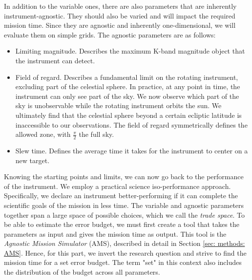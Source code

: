 \documentclass[12pt,a4paper]{article}
\numberwithin{equation}{section}
\numberwithin{figure}{section}
\numberwithin{table}{section}
\begin{document}
In addition to the variable ones, there are also parameters that are inherently instrument-agnostic. They should also be varied and will impact the required mission time. Since they are agnostic and inherently one-dimensional, we will evaluate them on simple grids. The agnostic parameters are as follows:
\begin{itemize}
    \item Limiting magnitude. Describes the maximum K-band magnitude object that the instrument can detect.
    \item Field of regard. Describes a fundamental limit on the rotating instrument, excluding part of the celestial sphere. In practice, at any point in time, the instrument can only see part of the sky. We now observe which part of the sky is unobservable while the rotating instrument orbits the sun. We ultimately find that the celestial sphere beyond a certain ecliptic latitude is inaccessible to our observations. The field of regard symmetrically defines the allowed zone, with $\frac{\pi}{2}$ the full sky.
    \item Slew time. Defines the average time it takes for the instrument to center on a new target.
\end{itemize}
Knowing the starting points and limits, we can now go back to the performance of the instrument. We employ a practical science iso-performance approach. Specifically, we declare an instrument better-performing if it can complete the scientific goals of the mission in less time. The variable and agnostic parameters together span a large space of possible choices, which we call the \textit{trade space}. To be able to estimate the error budget, we must first create a tool that takes the parameters as input and gives the mission time as output. This tool is the \textit{Agnostic Mission Simulator} (AMS), described in detail in Section \ref{sec: methods: AMS}. Hence, for this part, we invert the research question and strive to find the mission time for a set error budget. The term "set" in this context also includes the distribution of the budget across all parameters.
\end{document}
